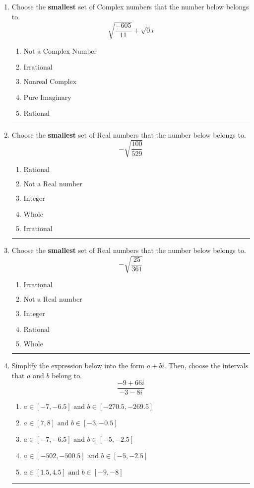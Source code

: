 \documentclass[14pt]{extbook}
\newcommand{\litem}[1]{\item#1\hspace*{-1cm}\rule{\textwidth}{0.4pt}}
\begin{document}
\begin{enumerate}
\litem{
Choose the \textbf{smallest} set of Complex numbers that the number below belongs to.\[ \sqrt{\frac{-605}{11}}+\sqrt{0}i \]\begin{enumerate}[label=\Alph*.]
\item \( \text{Not a Complex Number} \)
\item \( \text{Irrational} \)
\item \( \text{Nonreal Complex} \)
\item \( \text{Pure Imaginary} \)
\item \( \text{Rational} \)

\end{enumerate} }
\litem{
Choose the \textbf{smallest} set of Real numbers that the number below belongs to.\[ -\sqrt{\frac{100}{529}} \]\begin{enumerate}[label=\Alph*.]
\item \( \text{Rational} \)
\item \( \text{Not a Real number} \)
\item \( \text{Integer} \)
\item \( \text{Whole} \)
\item \( \text{Irrational} \)

\end{enumerate} }
\litem{
Choose the \textbf{smallest} set of Real numbers that the number below belongs to.\[ -\sqrt{\frac{25}{361}} \]\begin{enumerate}[label=\Alph*.]
\item \( \text{Irrational} \)
\item \( \text{Not a Real number} \)
\item \( \text{Integer} \)
\item \( \text{Rational} \)
\item \( \text{Whole} \)

\end{enumerate} }
\litem{
Simplify the expression below into the form $a+bi$. Then, choose the intervals that $a$ and $b$ belong to.\[ \frac{-9 + 66 i}{-3 - 8 i} \]\begin{enumerate}[label=\Alph*.]
\item \( a \in [-7, -6.5] \text{ and } b \in [-270.5, -269.5] \)
\item \( a \in [7, 8] \text{ and } b \in [-3, -0.5] \)
\item \( a \in [-7, -6.5] \text{ and } b \in [-5, -2.5] \)
\item \( a \in [-502, -500.5] \text{ and } b \in [-5, -2.5] \)
\item \( a \in [1.5, 4.5] \text{ and } b \in [-9, -8] \)


\end{enumerate}}
\end{enumerate}
\end{document}
